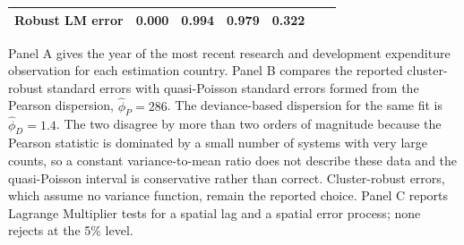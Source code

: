 \documentclass[ASNA,twocolumn]{USG}
\begin{document}
\begin{table}[!t]
\begin{tabular*}{\textwidth}{@{\extracolsep\fill}l r r r r r r@{}}
Robust LM error & 0.000 & 0.994 & 0.979 & 0.322 & \\
\bottomrule
\end{tabular*}
\begin{tablenotes}
\item[] Panel A gives the year of the most recent research and development expenditure observation for each estimation country. Panel B compares the reported cluster-robust standard errors with quasi-Poisson standard errors formed from the Pearson dispersion, $\hat\phi_{P} = 286$. The deviance-based dispersion for the same fit is $\hat\phi_{D} = 1.4$. The two disagree by more than two orders of magnitude because the Pearson statistic is dominated by a small number of systems with very large counts, so a constant variance-to-mean ratio does not describe these data and the quasi-Poisson interval is conservative rather than correct. Cluster-robust errors, which assume no variance function, remain the reported choice. Panel C reports Lagrange Multiplier tests for a spatial lag and a spatial error process; none rejects at the 5\% level.
\end{tablenotes}
\end{table}
\end{document}
